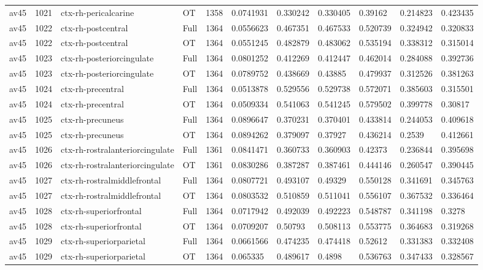 \begin{landscape}
\begin{longtable}{lllllllllll}
av45 & 1021 & ctx-rh-pericalcarine & OT & 1358 & 0.0741931 & 0.330242 & 0.330405 & 0.39162 & 0.214823 & 0.423435 \\
av45 & 1022 & ctx-rh-postcentral & Full & 1364 & 0.0556623 & 0.467351 & 0.467533 & 0.520739 & 0.324942 & 0.320833 \\
av45 & 1022 & ctx-rh-postcentral & OT & 1364 & 0.0551245 & 0.482879 & 0.483062 & 0.535194 & 0.338312 & 0.315014 \\
av45 & 1023 & ctx-rh-posteriorcingulate & Full & 1364 & 0.0801252 & 0.412269 & 0.412447 & 0.462014 & 0.284088 & 0.392736 \\
av45 & 1023 & ctx-rh-posteriorcingulate & OT & 1364 & 0.0789752 & 0.438669 & 0.43885 & 0.479937 & 0.312526 & 0.381263 \\
av45 & 1024 & ctx-rh-precentral & Full & 1364 & 0.0513878 & 0.529556 & 0.529738 & 0.572071 & 0.385603 & 0.315501 \\
av45 & 1024 & ctx-rh-precentral & OT & 1364 & 0.0509334 & 0.541063 & 0.541245 & 0.579502 & 0.399778 & 0.30817 \\
av45 & 1025 & ctx-rh-precuneus & Full & 1364 & 0.0896647 & 0.370231 & 0.370401 & 0.433814 & 0.244053 & 0.409618 \\
av45 & 1025 & ctx-rh-precuneus & OT & 1364 & 0.0894262 & 0.379097 & 0.37927 & 0.436214 & 0.2539 & 0.412661 \\
av45 & 1026 & ctx-rh-rostralanteriorcingulate & Full & 1361 & 0.0841471 & 0.360733 & 0.360903 & 0.42373 & 0.236844 & 0.395698 \\
av45 & 1026 & ctx-rh-rostralanteriorcingulate & OT & 1361 & 0.0830286 & 0.387287 & 0.387461 & 0.444146 & 0.260547 & 0.390445 \\
av45 & 1027 & ctx-rh-rostralmiddlefrontal & Full & 1364 & 0.0807721 & 0.493107 & 0.49329 & 0.550128 & 0.341691 & 0.345763 \\
av45 & 1027 & ctx-rh-rostralmiddlefrontal & OT & 1364 & 0.0803532 & 0.510859 & 0.511041 & 0.556107 & 0.367532 & 0.336464 \\
av45 & 1028 & ctx-rh-superiorfrontal & Full & 1364 & 0.0717942 & 0.492039 & 0.492223 & 0.548787 & 0.341198 & 0.3278 \\
av45 & 1028 & ctx-rh-superiorfrontal & OT & 1364 & 0.0709207 & 0.50793 & 0.508113 & 0.553775 & 0.364683 & 0.319268 \\
av45 & 1029 & ctx-rh-superiorparietal & Full & 1364 & 0.0661566 & 0.474235 & 0.474418 & 0.52612 & 0.331383 & 0.332408 \\
av45 & 1029 & ctx-rh-superiorparietal & OT & 1364 & 0.065335 & 0.489617 & 0.4898 & 0.536763 & 0.347433 & 0.328567 \\

\end{longtable}
\end{landscape}
